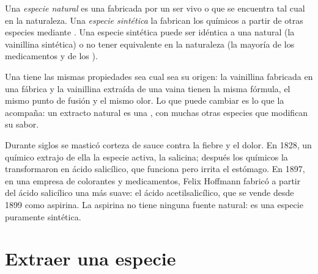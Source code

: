 \begin{definition}\label{def:g10:chemical-species:natural}
Una \emph{especie natural} es una 
fabricada por un ser vivo o que se encuentra tal cual en la naturaleza.
Una \emph{especie
sintética} la fabrican los químicos a partir de
otras especies mediante . Una especie sintética puede
ser idéntica a una natural (la vainillina sintética) o no tener
equivalente en la naturaleza (la mayoría de los medicamentos y de los
).
\end{definition}

\begin{proposition}\label{prop:g10:chemical-species:same}
Una  tiene las mismas propiedades sea cual sea su origen:
la vainillina fabricada en una fábrica y la vainillina extraída de una
vaina tienen la misma fórmula, el mismo punto de fusión y el mismo olor.
Lo que puede cambiar es lo que la acompaña: un extracto natural es una
, con muchas otras especies que modifican su sabor.
\end{proposition}

\begin{history}
Durante siglos se masticó corteza de sauce contra la fiebre y el dolor.
En 1828, un químico extrajo de ella la especie activa, la salicina;
después los químicos la transformaron en ácido salicílico, que funciona
pero irrita el estómago. En 1897, en una empresa de colorantes y
medicamentos, Felix Hoffmann fabricó a partir del ácido salicílico una
 más suave: el ácido acetilsalicílico, que se vende
desde 1899 como aspirina. La aspirina no tiene ninguna fuente natural:
es una especie puramente sintética.
\end{history}

\section{Extraer una especie}

